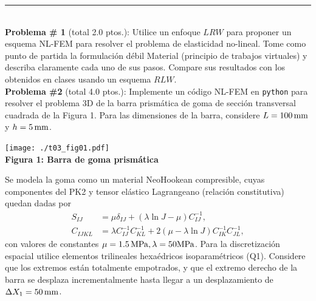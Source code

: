 \documentclass[11pt,letterpaper]{article}
\begin{document}
\rule{\linewidth}{0.4mm}\\[20pt]


{\bf Problema \# 1} (total 2.0 ptos.): Utilice un enfoque $LRW$ para proponer un esquema NL-FEM para resolver el problema de elasticidad no-lineal. Tome como punto de partida la formulaci\'on d\'ebil Material (principio de trabajos virtuales) y describa claramente cada uno de sus pasos. Compare sus resultados con los obtenidos en clases usando un esquema $RLW$. \\






{\bf Problema \#2} (total 4.0 ptos.): Implemente un c\'odigo NL-FEM en {\tt python} para resolver el problema 3D de la barra prism\'atica de goma de secci\'on transversal cuadrada de la Figura 1. Para las dimensiones de la barra, considere $L=100\,\rm mm$ y  $h=5\,\rm mm$. 
\begin{center}
	\texttt{[image: ./t03\_fig01.pdf]}\\
	{\bf Figura 1: Barra de goma prism\'atica}
\end{center}
Se modela la goma como un material NeoHookean compresible, cuyas componentes del PK2 y tensor el\'astico Lagrangeano (relaci\'on constitutiva) quedan dadas por
\begin{align*}
S_{IJ} &= \mu \delta_{IJ} + (\lambda \ln J - \mu) C^{-1}_{IJ},\\
C_{IJKL} &= \lambda C_{IJ}^{-1} C_{KL}^{-1}  + 2(\mu - \lambda \ln J) C_{IK}^{-1} C_{JL}^{-1},
\end{align*}
con valores de constantes $\mu = 1.5\,\rm MPa, \lambda =50 MPa$. Para la discretizaci\'on espacial utilice elementos trilineales hexa\'edricos isoparam\'etricos (Q1). Considere que los extremos est\'an totalmente empotrados, y que el extremo derecho de la barra se desplaza incrementalmente hasta llegar a un desplazamiento de $\Delta X_1 = 50\,\rm mm $.\\
\end{document}
